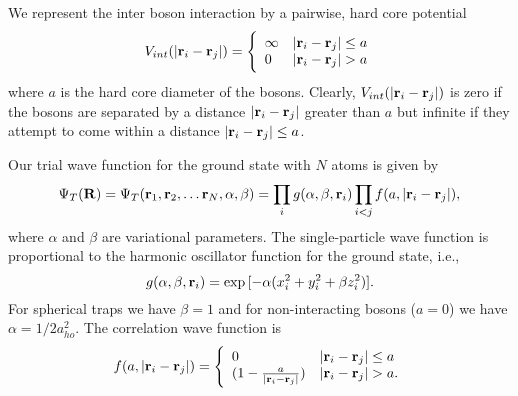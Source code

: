 \documentclass[10pt]{article}
\begin{document}
 We represent the inter boson interaction by a pairwise, hard core potential
 \begin{equation}
 V_{int}(|{\bf r}_i-{\bf r}_j|) =  \Bigg\{
 \begin{array}{ll}
	 \infty & {|{\bf r}_i-{\bf r}_j|} \leq {a}\\
	 0 & {|{\bf r}_i-{\bf r}_j|} > {a}
 \end{array}
 \end{equation}
 where ${a}$ is the hard core diameter of the bosons.  Clearly, $V_{int}(|{\bf r}_i-{\bf r}_j|)$
 is zero if the bosons are separated by a distance $|{\bf r}_i-{\bf r}_j|$ greater than $a$ but
 infinite if they attempt to come within a distance $|{\bf r}_i-{\bf r}_j| \leq a$.

 Our trial wave function for the ground state with $N$ atoms is given by
 \begin{equation}
 \Psi_T({\bf R})=\Psi_T({\bf r}_1, {\bf r}_2, \dots {\bf r}_N,\alpha,\beta)=\prod_i g(\alpha,\beta,{\bf r}_i)\prod_{i<j}f(a,|{\bf r}_i-{\bf r}_j|),
 \label{eq:trialwf}
 \end{equation}
 where $\alpha$ and $\beta$ are variational parameters. The single-particle wave function is proportional
 to the harmonic oscillator function for the ground state, i.e.,
 \begin{equation}
    g(\alpha,\beta,{\bf r}_i)= \exp{[-\alpha(x_i^2+y_i^2+\beta z_i^2)]}.
 \end{equation}
 For spherical traps we have $\beta = 1$ and for non-interacting bosons ($a=0$) we have
 $\alpha = 1/2a_{ho}^2$.
 The correlation wave function is 
 \begin{equation}
    f(a,|{\bf r}_i-{\bf r}_j|)=\Bigg\{
 \begin{array}{ll}
	 0 & {|{\bf r}_i-{\bf r}_j|} \leq {a}\\
	 (1-\frac{a}{|{\bf r}_i-{\bf r}_j|}) & {|{\bf r}_i-{\bf r}_j|} > {a}.
 \end{array}
 \end{equation}  
\end{document}
